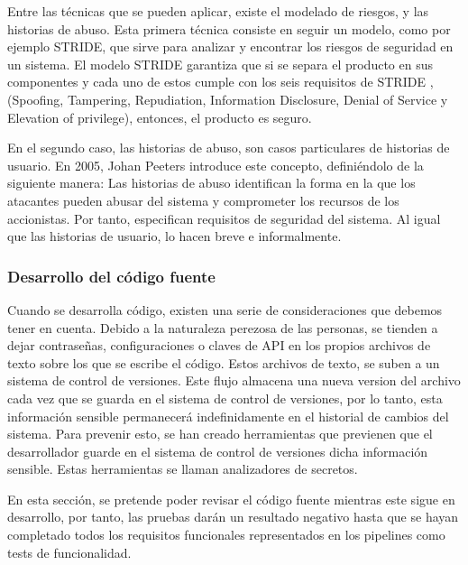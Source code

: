 \documentclass[12pt]{report} %
\begin{document}
Entre las técnicas que se pueden aplicar, existe el modelado de riesgos, y las
historias de abuso.  Esta primera técnica consiste en seguir un modelo, como por
ejemplo \gls{STRIDE}, que sirve para analizar y encontrar los riesgos de
seguridad en un sistema.  El modelo \gls{STRIDE} garantiza que si se separa el
producto en sus componentes y cada uno de estos cumple con los seis requisitos
de \gls{STRIDE} \cite{Loren1999}, (Spoofing, Tampering, Repudiation, Information
Disclosure, Denial of Service y Elevation of privilege), entonces, el producto
es seguro.

En el segundo caso, las historias de abuso, son casos particulares de historias
de usuario.  En 2005, Johan Peeters introduce este concepto, definiéndolo de la
siguiente manera: Las historias de abuso identifican la forma en la que los
atacantes pueden abusar del sistema y comprometer los recursos de los
accionistas.  Por tanto, especifican requisitos de seguridad del sistema.  Al
igual que las historias de usuario, lo hacen breve e informalmente.
\cite{Peeters2005}

\subsubsection{Desarrollo del código fuente}
 
Cuando se desarrolla código, existen una serie de consideraciones que debemos
tener en cuenta.  Debido a la naturaleza perezosa de las personas, se tienden a
dejar contraseñas, configuraciones o claves de \gls{API} en los propios archivos
de texto sobre los que se escribe el código.  Estos archivos de texto, se suben
a un sistema de control de versiones.  Este flujo almacena una nueva version del
archivo cada vez que se guarda en el sistema de control de versiones, por lo
tanto, esta información sensible permanecerá indefinidamente en el historial de
cambios del sistema.  Para prevenir esto, se han creado herramientas que
previenen que el desarrollador guarde en el sistema de control de versiones
dicha información sensible.  Estas herramientas se llaman analizadores de
secretos.

En esta sección, se pretende poder revisar el código fuente mientras este sigue
en desarrollo, por tanto, las pruebas darán un resultado negativo hasta que se
hayan completado todos los requisitos funcionales representados en los pipelines
como tests de funcionalidad.
\end{document}
